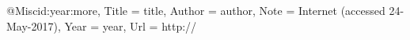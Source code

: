 @Misc{id:year:more,                                                        
  Title                    = {title},     
  Author                   = {author},  
  Note                     = {Internet (accessed 24-May-2017)},
  Year                     = {year},                                
  Url                      = {http://}
} 

